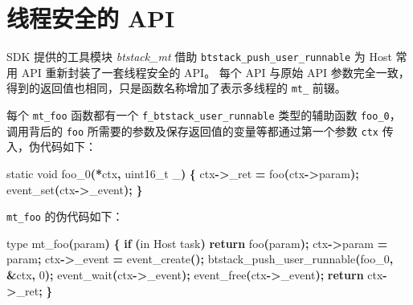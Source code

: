 \documentclass[
  12pt,
]{book}
\newenvironment{Shaded}{\begin{snugshade}}{\end{snugshade}}
\newcommand{\ControlFlowTok}[1]{\textcolor[rgb]{0.13,0.29,0.53}{\textbf{#1}}}
\newcommand{\DataTypeTok}[1]{\textcolor[rgb]{0.13,0.29,0.53}{#1}}
\newcommand{\DecValTok}[1]{\textcolor[rgb]{0.00,0.00,0.81}{#1}}
\newcommand{\NormalTok}[1]{#1}
\newcommand{\OperatorTok}[1]{\textcolor[rgb]{0.81,0.36,0.00}{\textbf{#1}}}
\begin{document}
\hypertarget{ch-misc-thread-safe-api}{%
\section{线程安全的 API}\label{ch-misc-thread-safe-api}}

SDK 提供的工具模块 \emph{btstack\_mt} 借助 \texttt{btstack\_push\_user\_runnable} 为 Host 常用 API
重新封装了一套线程安全的 API。
每个 API 与原始 API 参数完全一致，得到的返回值也相同，只是函数名称增加了表示多线程的 \texttt{mt\_} 前辍。

每个 \texttt{mt\_foo} 函数都有一个 \texttt{f\_btstack\_user\_runnable} 类型的辅助函数 \texttt{foo\_0}，调用背后的
\texttt{foo} 所需要的参数及保存返回值的变量等都通过第一个参数 \texttt{ctx} 传入，伪代码如下：

\begin{Shaded}
\begin{Highlighting}[]
\DataTypeTok{static} \DataTypeTok{void}\NormalTok{ foo\_0}\OperatorTok{(*}\NormalTok{ctx}\OperatorTok{,} \DataTypeTok{uint16\_t}\NormalTok{ \_}\OperatorTok{)}
\OperatorTok{\{}
\NormalTok{  ctx}\OperatorTok{{-}\textgreater{}}\NormalTok{\_ret }\OperatorTok{=}\NormalTok{ foo}\OperatorTok{(}\NormalTok{ctx}\OperatorTok{{-}\textgreater{}}\NormalTok{param}\OperatorTok{);}
\NormalTok{  event\_set}\OperatorTok{(}\NormalTok{ctx}\OperatorTok{{-}\textgreater{}}\NormalTok{\_event}\OperatorTok{);}
\OperatorTok{\}}
\end{Highlighting}
\end{Shaded}

\texttt{mt\_foo} 的伪代码如下：

\begin{Shaded}
\begin{Highlighting}[]
\NormalTok{type mt\_foo}\OperatorTok{(}\NormalTok{param}\OperatorTok{)}
\OperatorTok{\{}
  \ControlFlowTok{if} \OperatorTok{(}\NormalTok{in Host task}\OperatorTok{)}
    \ControlFlowTok{return}\NormalTok{ foo}\OperatorTok{(}\NormalTok{param}\OperatorTok{);}
\NormalTok{  ctx}\OperatorTok{{-}\textgreater{}}\NormalTok{param }\OperatorTok{=}\NormalTok{ param}\OperatorTok{;}
\NormalTok{  ctx}\OperatorTok{{-}\textgreater{}}\NormalTok{\_event }\OperatorTok{=}\NormalTok{ event\_create}\OperatorTok{();}
\NormalTok{  btstack\_push\_user\_runnable}\OperatorTok{(}\NormalTok{foo\_0}\OperatorTok{,} \OperatorTok{\&}\NormalTok{ctx}\OperatorTok{,} \DecValTok{0}\OperatorTok{);}
\NormalTok{  event\_wait}\OperatorTok{(}\NormalTok{ctx}\OperatorTok{{-}\textgreater{}}\NormalTok{\_event}\OperatorTok{);}
\NormalTok{  event\_free}\OperatorTok{(}\NormalTok{ctx}\OperatorTok{{-}\textgreater{}}\NormalTok{\_event}\OperatorTok{);}
  \ControlFlowTok{return}\NormalTok{ ctx}\OperatorTok{{-}\textgreater{}}\NormalTok{\_ret}\OperatorTok{;}
\OperatorTok{\}}
\end{Highlighting}
\end{Shaded}
\end{document}
